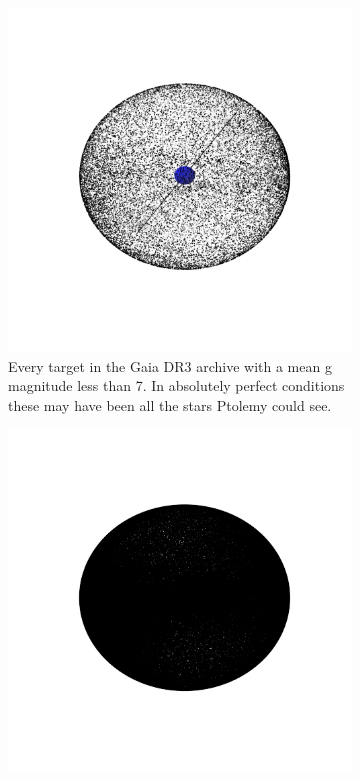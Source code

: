 \begin{figure}[htbp]
\begin{subfigure}[t]{0.3\textwidth}
      \includegraphics[width=\textwidth]{figures/introduction/ModernStarsGaiaL7.png}
      \caption{Every target in the Gaia DR3 archive with a mean g magnitude
      less than 7. In absolutely perfect conditions these may have been all the
      stars Ptolemy could see.}
      \label{fig:starsL7}
  \end{subfigure}
  \begin{subfigure}[t]{0.3\textwidth}
      \centering
      \includegraphics[width=\textwidth]{figures/introduction/ModernStarsGaiaL10.png}

\end{subfigure}
\end{figure}
